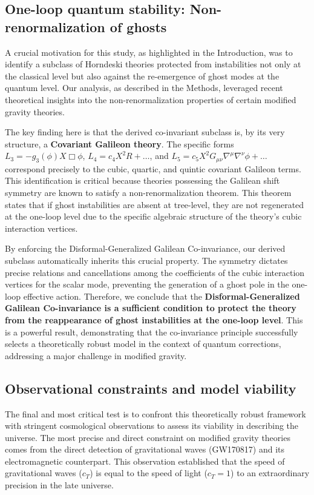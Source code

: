 \documentclass[twocolumn]{aastex631}
\begin{document}
\subsection{One-loop quantum stability: Non-renormalization of ghosts}
A crucial motivation for this study, as highlighted in the Introduction, was to identify a subclass of Horndeski theories protected from instabilities not only at the classical level but also against the re-emergence of ghost modes at the quantum level. Our analysis, as described in the Methods, leveraged recent theoretical insights into the non-renormalization properties of certain modified gravity theories.

The key finding here is that the derived co-invariant subclass is, by its very structure, a \textbf{Covariant Galileon theory}. The specific forms $L_3 = -g_3(\phi) X \Box\phi$, $L_4 = c_4 X^2 R + \dots$, and $L_5 = c_5 X^2 G_{\mu\nu} \nabla^\mu\nabla^\nu\phi + \dots$ correspond precisely to the cubic, quartic, and quintic covariant Galileon terms. This identification is critical because theories possessing the Galilean shift symmetry are known to satisfy a non-renormalization theorem. This theorem states that if ghost instabilities are absent at tree-level, they are not regenerated at the one-loop level due to the specific algebraic structure of the theory's cubic interaction vertices.

By enforcing the Disformal-Generalized Galilean Co-invariance, our derived subclass automatically inherits this crucial property. The symmetry dictates precise relations and cancellations among the coefficients of the cubic interaction vertices for the scalar mode, preventing the generation of a ghost pole in the one-loop effective action. Therefore, we conclude that the \textbf{Disformal-Generalized Galilean Co-invariance is a sufficient condition to protect the theory from the reappearance of ghost instabilities at the one-loop level}. This is a powerful result, demonstrating that the co-invariance principle successfully selects a theoretically robust model in the context of quantum corrections, addressing a major challenge in modified gravity.

\subsection{Observational constraints and model viability}
The final and most critical test is to confront this theoretically robust framework with stringent cosmological observations to assess its viability in describing the universe. The most precise and direct constraint on modified gravity theories comes from the direct detection of gravitational waves (GW170817) and its electromagnetic counterpart. This observation established that the speed of gravitational waves ($c_T$) is equal to the speed of light ($c_T=1$) to an extraordinary precision in the late universe.
\end{document}
